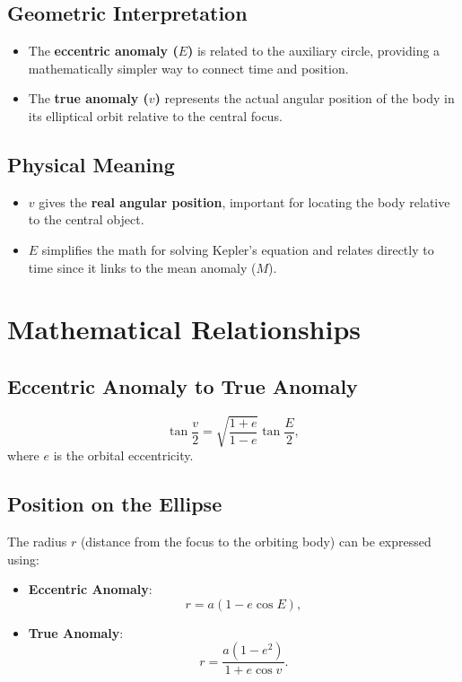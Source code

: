 \documentclass[11pt]{article}
\begin{document}
\subsection*{Geometric Interpretation}
\begin{itemize}
    \item The \textbf{eccentric anomaly (\(E\))} is related to the auxiliary circle, providing a mathematically simpler way to connect time and position.
    \item The \textbf{true anomaly (\(v\))} represents the actual angular position of the body in its elliptical orbit relative to the central focus.
\end{itemize}

\subsection*{Physical Meaning}
\begin{itemize}
    \item \(v\) gives the \textbf{real angular position}, important for locating the body relative to the central object.
    \item \(E\) simplifies the math for solving Kepler's equation and relates directly to time since it links to the mean anomaly (\(M\)).
\end{itemize}

\section*{Mathematical Relationships}
\subsection*{Eccentric Anomaly to True Anomaly}
\[
\tan\frac{v}{2} = \sqrt{\frac{1 + e}{1 - e}} \tan\frac{E}{2},
\]
where \(e\) is the orbital eccentricity.

\subsection*{Position on the Ellipse}
The radius \(r\) (distance from the focus to the orbiting body) can be expressed using:
\begin{itemize}
    \item \textbf{Eccentric Anomaly}:
    \[
    r = a(1 - e \cos E),
    \]
    \item \textbf{True Anomaly}:
    \[
    r = \frac{a(1 - e^2)}{1 + e \cos v}.
    \]
\end{itemize}
\end{document}
